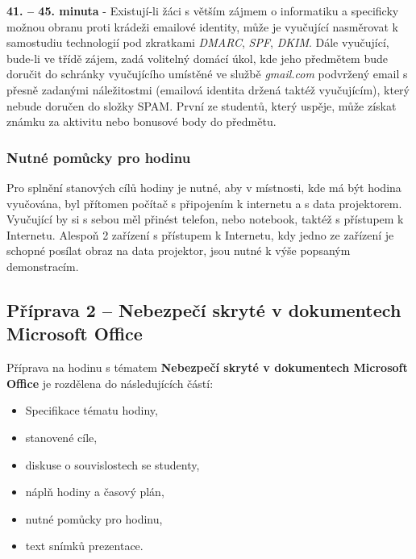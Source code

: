 \documentclass[a4paper, 12pt]{article}
\begin{document}
\textbf{41. -- 45. minuta} - Existují-li žáci s větším zájmem o informatiku a specificky možnou obranu proti krádeži emailové identity, může je vyučující nasměrovat k samostudiu technologií pod zkratkami \textit{DMARC}, \textit{SPF}, \textit{DKIM}. Dále vyučující, bude-li ve třídě zájem, zadá volitelný domácí úkol, kde jeho předmětem bude doručit do schránky vyučujícího umístěné ve službě \textit{gmail.com} podvržený email s přesně zadanými náležitostmi (emailová identita držená taktéž vyučujícím), který nebude doručen do složky SPAM. První ze studentů, který uspěje, může získat známku za aktivitu nebo bonusové body do předmětu.

\subsubsection{Nutné pomůcky pro hodinu}
Pro splnění stanových cílů hodiny je nutné, aby v místnosti, kde má být hodina vyučována, byl přítomen počítač s připojením k internetu a s data projektorem. Vyučující by si s sebou měl přinést telefon, nebo notebook, taktéž s přístupem k Internetu. Alespoň 2 zařízení s přístupem k Internetu, kdy jedno ze zařízení je schopné posílat obraz na data projektor, jsou nutné k výše popsaným demonstracím.


\subsection{Příprava 2 -- Nebezpečí skryté v dokumentech Microsoft Office}
Příprava na hodinu s tématem \textbf{Nebezpečí skryté v dokumentech Microsoft Office} je rozdělena do následujících částí:
    \begin{itemize}
        \setlength{\itemsep}{-3pt}
        \item Specifikace tématu hodiny,
        \item stanovené cíle,
        \item diskuse o souvislostech se studenty,
        \item náplň hodiny a časový plán,
        \item nutné pomůcky pro hodinu,
        \item text snímků prezentace.
    \end{itemize}
\end{document}
